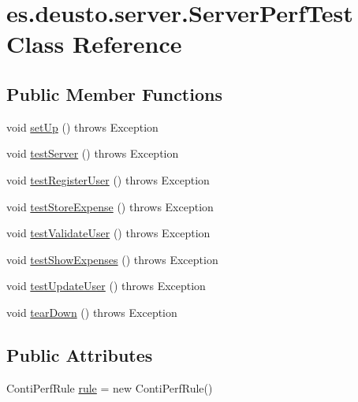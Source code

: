 \hypertarget{classes_1_1deusto_1_1server_1_1_server_perf_test}{}\section{es.\+deusto.\+server.\+Server\+Perf\+Test Class Reference}
\label{classes_1_1deusto_1_1server_1_1_server_perf_test}
\subsection*{Public Member Functions}
\begin{DoxyCompactItemize}
\item 
void \hyperlink{classes_1_1deusto_1_1server_1_1_server_perf_test_a4e78c4f805d8f61c1f23f55dc5b9fe00}{set\+Up} ()  throws Exception 
\item 
void \hyperlink{classes_1_1deusto_1_1server_1_1_server_perf_test_a5c187f8b48709153430bb3e21d392315}{test\+Server} ()  throws Exception 
\item 
void \hyperlink{classes_1_1deusto_1_1server_1_1_server_perf_test_acd84ae388a6b45b90f056d6c051908c6}{test\+Register\+User} ()  throws Exception 
\item 
void \hyperlink{classes_1_1deusto_1_1server_1_1_server_perf_test_a1d4685eb157c172ece9a6ef9ba302696}{test\+Store\+Expense} ()  throws Exception 
\item 
void \hyperlink{classes_1_1deusto_1_1server_1_1_server_perf_test_a9006eeebc72b0f5aa9ee129d11a28b42}{test\+Validate\+User} ()  throws Exception 
\item 
void \hyperlink{classes_1_1deusto_1_1server_1_1_server_perf_test_a823b0fc7575feded84e73dc929a32399}{test\+Show\+Expenses} ()  throws Exception 
\item 
void \hyperlink{classes_1_1deusto_1_1server_1_1_server_perf_test_aeb4e8f76604acdd98213dec2e1f390d6}{test\+Update\+User} ()  throws Exception
\item 
void \hyperlink{classes_1_1deusto_1_1server_1_1_server_perf_test_a81109436602a11e6c7b5221d4b004f9b}{tear\+Down} ()  throws Exception 
\end{DoxyCompactItemize}
\subsection*{Public Attributes}
\begin{DoxyCompactItemize}
\item 
Conti\+Perf\+Rule \hyperlink{classes_1_1deusto_1_1server_1_1_server_perf_test_a34a5221b5b0280bcdd240acb1d1f681b}{rule} = new Conti\+Perf\+Rule()
\end{DoxyCompactItemize}


